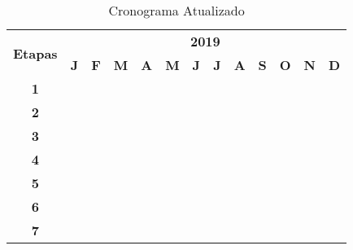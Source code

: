 \begin{table}[h]
  \centering
  \begin{tabular}{|c||c|c|c|c|c|c|c|c|c|c|c|c|}
  \hline
  \multirow{2}{*}{\textbf{\small{Etapas}}} & \multicolumn{12}{|c||}{\textbf{\small{2019}}} \\
  \cline{2-13}
   & \textbf{J} & \textbf{F} & \textbf{M} & \textbf{A} & \textbf{M} & \textbf{J} & \textbf{J} & \textbf{A} & \textbf{S} & \textbf{O} & \textbf{N} & \textbf{D} \\
  \hline \hline
  \textbf{\small{1}} & & & \cellcolor{gray} & \cellcolor{gray} & \cellcolor{gray} & & & & & & & \\ \hline
  \textbf{\small{2}} & & & & \cellcolor{gray} & & & & & & & & \\ \hline
  \textbf{\small{3}} & & & & & \cellcolor{gray} & \cellcolor{gray} & \cellcolor{gray} & & & & & \\ \hline
  \textbf{\small{4}} & & & & & \cellcolor{gray} & \cellcolor{gray} & \cellcolor{gray} & \cellcolor{gray} & & & & \\ \hline
  \textbf{\small{5}} & & & & & & \cellcolor{gray} & \cellcolor{gray} & \cellcolor{gray} & \cellcolor{gray} & & & \\ \hline
  \textbf{\small{6}} & & & & & & & \cellcolor{gray} & \cellcolor{gray} & \cellcolor{gray} & \cellcolor{gray} & & \\ \hline
  \textbf{\small{7}} & & & & & & & & & \cellcolor{gray} & \cellcolor{gray} & \cellcolor{gray} & \\ \hline
  \end{tabular}
  \caption{Cronograma Atualizado}
  \label{tab:novo-cronograma}
\end{table}
